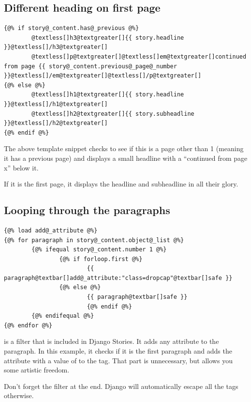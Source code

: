 \documentclass[letterpaper,10pt,english]{manual}
\begin{document}
\subsection{Different heading on first page}

\begin{Verbatim}[commandchars=@\[\]]
{@% if story@_content.has@_previous @%}
        @textless[]h3@textgreater[]{{ story.headline }}@textless[]/h3@textgreater[]
        @textless[]p@textgreater[]@textless[]em@textgreater[]continued from page {{ story@_content.previous@_page@_number }}@textless[]/em@textgreater[]@textless[]/p@textgreater[]
{@% else @%}
        @textless[]h1@textgreater[]{{ story.headline }}@textless[]/h1@textgreater[]
        @textless[]h2@textgreater[]{{ story.subheadline }}@textless[]/h2@textgreater[]
{@% endif @%}
\end{Verbatim}

The above template snippet checks to see if this is a page other than 1 (meaning it has a previous page) and displays a small headline with a ``continued from page x'' below it.

If it is the first page, it displays the headline and subheadline in all their glory.


\subsection{Looping through the paragraphs}

\begin{Verbatim}[commandchars=@\[\]]
{@% load add@_attribute @%}
{@% for paragraph in story@_content.object@_list @%}
        {@% ifequal story@_content.number 1 @%}
                {@% if forloop.first @%}
                        {{ paragraph@textbar[]add@_attribute:"class=dropcap"@textbar[]safe }}
                {@% else @%}
                        {{ paragraph@textbar[]safe }}
                        {@% endif @%}
        {@% endifequal @%}
{@% endfor @%}
\end{Verbatim}

 is a filter that is included in Django Stories. It adds any attribute to the paragraph. In this example, it checks if it is the first paragraph and adds the attribute  with a value of  to the  tag. That part is unnecessary, but allows you some artistic freedom.

Don't forget the  filter at the end. Django will automatically escape all the tags otherwise.
\end{document}
